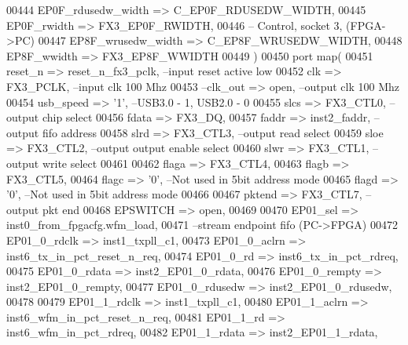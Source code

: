 \begin{DoxyCode}
00444       EP0F\_rdusedw\_width   => C_EP0F_RDUSEDW_WIDTH,
00445       EP0F_rwidth               => FX3_EP0F_RWIDTH,
00446 \textcolor{keyword}{      -- Control, socket 3, (FPGA->PC)}
00447       EP8F\_wrusedw\_width   => C_EP8F_WRUSEDW_WIDTH,
00448       EP8F_wwidth               => FX3_EP8F_WWIDTH 
00449    \textcolor{vhdlchar}{)}
00450    \textcolor{keywordflow}{port} \textcolor{keywordflow}{map}(
00451       reset_n              => reset_n_fx3_pclk,\textcolor{keyword}{ --input reset active low}
00452       clk                  => FX3_PCLK,\textcolor{keyword}{         --input clk 100 Mhz  }
00453 \textcolor{keyword}{      --clk\_out              => open,             --output clk 100 Mhz }
00454       usb_speed            => '1',\textcolor{keyword}{              --USB3.0 - 1, USB2.0 - 0}
00455       slcs                 => FX3_CTL0,\textcolor{keyword}{         --output chip select}
00456       fdata                => FX3_DQ,         
00457       faddr                => inst2_faddr,\textcolor{keyword}{      --output fifo address}
00458       slrd                 => FX3_CTL3,\textcolor{keyword}{         --output read select}
00459       sloe                 => FX3_CTL2,\textcolor{keyword}{         --output output enable select}
00460       slwr                 => FX3_CTL1,\textcolor{keyword}{         --output write select}
00461                   
00462       flaga                => FX3_CTL4,                                
00463       flagb                => FX3_CTL5,
00464       flagc                => '0',\textcolor{keyword}{   --Not used in 5bit address mode}
00465       flagd                => '0',\textcolor{keyword}{   --Not used in 5bit address mode}
00466       
00467       pktend               => FX3_CTL7,\textcolor{keyword}{  --output pkt end }
00468       EPSWITCH             => \textcolor{keywordflow}{open},
00469       
00470       EP01\_sel             => inst0\_from\_fpgacfg.wfm\_load,
00471 \textcolor{keyword}{      --stream endpoint fifo (PC->FPGA) }
00472       EP01\_0\_rdclk         => inst1_txpll_c1,
00473       EP01\_0\_aclrn         => inst6_tx_in_pct_reset_n_req,
00474       EP01\_0\_rd            => inst6_tx_in_pct_rdreq,
00475       EP01\_0\_rdata         => inst2_EP01_0_rdata,
00476       EP01\_0\_rempty        => inst2_EP01_0_rempty,
00477       EP01\_0\_rdusedw       => inst2_EP01_0_rdusedw,
00478      
00479       EP01\_1\_rdclk         => inst1_txpll_c1,
00480       EP01\_1\_aclrn         => inst6_wfm_in_pct_reset_n_req,
00481       EP01\_1\_rd            => inst6_wfm_in_pct_rdreq,
00482       EP01\_1\_rdata         => inst2_EP01_1_rdata,

\end{DoxyCode}
